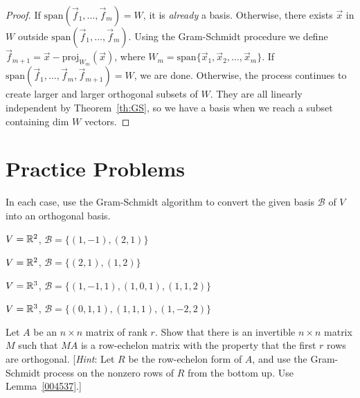 \documentclass{ximera}
\begin{document}
\begin{proof}
If $\mbox{span}\left(\vec{f}_{1}, \dots , \vec{f}_{m}\right) = W$, it is \textit{already} a basis. Otherwise, there exists $\vec{x}$ in $W$ outside $\mbox{span}\left(\vec{f}_{1}, \dots , \vec{f}_{m}\right)$. Using the Gram-Schmidt procedure we define $\vec{f}_{m+1} = \vec{x} - \mbox{proj}_{W_{m}}(\vec{x})$, where $W_m = \mbox{span}\{\vec{x}_{1},\vec{x}_{2},\ldots,\vec{x}_{m}\}$. If $\mbox{span}\left(\vec{f}_{1}, \dots, \vec{f}_{m}, \vec{f}_{m+1}\right) = W$, we are done. Otherwise, the process continues to create larger and larger orthogonal subsets of $W$. They are all linearly independent by Theorem~\ref{th:GS}, so we have a basis when we reach a subset containing \mbox{dim} $W$ vectors.
\end{proof}


\section*{Practice Problems}

\begin{problem}
In each case, use the Gram-Schmidt algorithm to convert the given basis $\mathcal{B}$ of $V$ into an orthogonal basis.  

\begin{problem}\label{GS1}
$V = \mathbb{R}^2$, $\mathcal{B} = \{(1, -1), (2, 1)\}$
\end{problem}
\begin{problem}
$V = \mathbb{R}^2$, $\mathcal{B} = \{(2, 1), (1, 2)\}$
\end{problem}
\begin{problem}
$V = \mathbb{R}^3$, $\mathcal{B} = \{(1, -1, 1), (1, 0, 1), (1, 1, 2)\}$

\end{problem}
\begin{problem}
$V = \mathbb{R}^3$, $\mathcal{B} = \{(0, 1, 1), (1, 1, 1), (1, -2, 2)\}$
\end{problem}
\end{problem}

\begin{problem}
Let $A$ be an $n \times n$ matrix of rank $r$. Show that there is an invertible $n \times n$ matrix $M$ such that $MA$ is a row-echelon matrix with the property that the first $r$ rows are orthogonal. [\textit{Hint}: Let $R$ be the row-echelon form of $A$, and use the Gram-Schmidt process on the nonzero rows of $R$ from the bottom up. Use Lemma~\ref{004537}.]
\end{problem}
\end{document}
